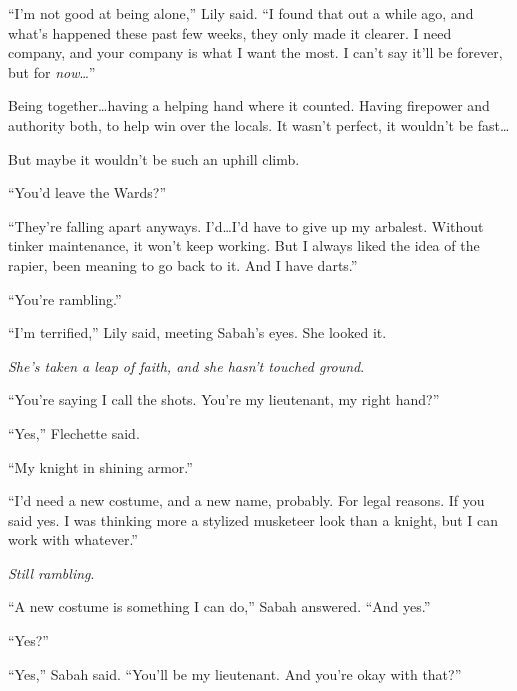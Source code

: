 ``I'm not good at being alone,'' Lily said.  ``I found that out a while ago, and what's happened these past few weeks, they only made it clearer.  I need company, and your company is what I want the most.  I can't say it'll be forever, but for \emph{now}\ldots''



Being together\ldots having a helping hand where it counted.  Having firepower and authority both, to help win over the locals.  It wasn't perfect, it wouldn't be fast\ldots



But maybe it wouldn't be such an uphill climb.



``You'd leave the Wards?''



``They're falling apart anyways.  I'd\ldots I'd have to give up my arbalest.  Without tinker maintenance, it won't keep working.  But I always liked the idea of the rapier, been meaning to go back to it.  And I have darts.''



``You're rambling.''



``I'm terrified,'' Lily said, meeting Sabah's eyes.  She looked it.



\emph{She's taken a leap of faith, and she hasn't touched ground}.



``You're saying I call the shots.  You're my lieutenant, my right hand?''



``Yes,'' Flechette said.



``My knight in shining armor.''



``I'd need a new costume, and a new name, probably.  For legal reasons.  If you said yes.  I was thinking more a stylized musketeer look than a knight, but I can work with whatever.''



\emph{Still rambling}.



``A new costume is something I can do,'' Sabah answered.  ``And yes.''



``Yes?''



``Yes,'' Sabah said.  ``You'll be my lieutenant.  And you're okay with that?''



